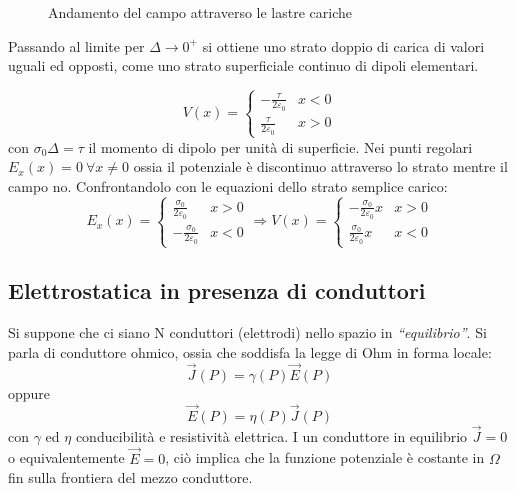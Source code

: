 \begin{figure}[h] %
\centering
{}
\caption{Andamento del campo attraverso le lastre cariche}
\label{fig:campo_lastre_cariche}
\end{figure}

Passando al limite per $\Delta \to 0^+$ si ottiene uno strato doppio di carica di valori
uguali ed opposti, come uno strato superficiale continuo di dipoli elementari.

$$
V(x) = \begin{cases}
-\frac{\tau}{2\varepsilon_0} & x<0 \\
\frac{\tau}{2\varepsilon_0} & x>0
\end{cases}
$$
con $\sigma_0\Delta = \tau$ il momento di dipolo per unità di superficie.
Nei punti regolari $E_x(x) = 0\ \forall x \neq 0 $ ossia il potenziale è discontinuo
attraverso lo strato mentre il campo no.
Confrontandolo con le equazioni dello strato semplice carico:
$$
E_x(x) = \begin{cases}
\frac{\sigma_0}{2\varepsilon_0} & x > 0\\
- \frac{\sigma_0}{2 \varepsilon_0} & x < 0
\end{cases} \Rightarrow V(x) = \begin{cases}
-\frac{\sigma_0}{2\varepsilon_0}x & x > 0 \\
\frac{\sigma_0}{2\varepsilon_0}x & x<0
\end{cases}
$$

\subsection{Elettrostatica in presenza di conduttori}
Si suppone che ci siano N conduttori (elettrodi) nello spazio in \textit{``equilibrio''}.
Si parla di conduttore ohmico, ossia che soddisfa la legge di Ohm in forma locale:
$$
\vec{J}(P) = \gamma(P)\vec{E}(P)
$$
oppure
$$
\vec{E}(P) = \eta(P)\vec{J}(P)
$$
con $\gamma$ ed $\eta$ conducibilità e resistività elettrica.
I un conduttore in equilibrio $\vec{J} = 0$ o equivalentemente $\vec{E} = 0$, ciò implica 
che la funzione potenziale è costante in $\Omega$ fin sulla frontiera del mezzo conduttore.

